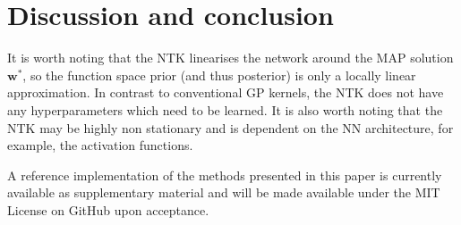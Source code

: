 \documentclass{article}
\newcommand{\weights}{\ensuremath{\mathbf{w}}}
\begin{document}
%





\section{Discussion and conclusion}
\label{sec:conclusion}
%



It is worth noting that the NTK linearises the network around the MAP solution $\weights^{*}$,
so the function space prior (and thus posterior) is only a locally linear approximation.
In contrast to conventional GP kernels, the NTK does not have any hyperparameters which need to be learned.
It is also worth noting that the NTK may be highly non stationary and is dependent on the NN architecture, for example, the activation functions.






A reference implementation of the methods presented in this paper is currently available as supplementary material and will be made available under the MIT License on GitHub upon acceptance.




\end{document}
